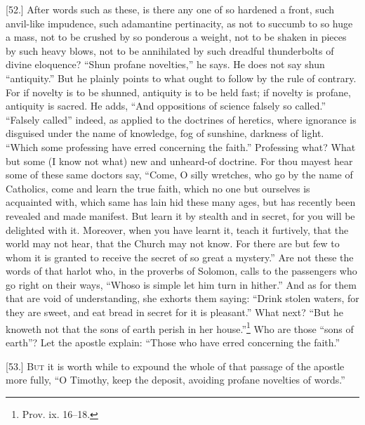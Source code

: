 [52.] After words such as these, is there any one of so hardened a front, such anvil-like impudence, such adamantine pertinacity, as not to succumb to so huge a mass, not to be crushed by so ponderous a weight, not to be shaken in pieces by such heavy blows, not to be annihilated by such dreadful thunderbolts of divine eloquence? “Shun profane novelties,” he says. He does not say shun “antiquity.” But he plainly points to what ought to follow by the rule of contrary. For if novelty is to be shunned, antiquity is to be held fast; if novelty is profane, antiquity is sacred. He adds, “And oppositions of science falsely so called.” “Falsely called” indeed, as applied to the doctrines of heretics, where ignorance is disguised under the name of knowledge, fog of sunshine, darkness of light. “Which some professing have erred concerning the faith.” Professing what? What but some (I know not what) new and unheard-of doctrine. For thou mayest hear some of these same doctors say, “Come, O silly wretches, who go by the name of Catholics, come and learn the true faith, which no one but ourselves is acquainted with, which same has lain hid these many ages, but has recently been revealed and made manifest. But learn it by stealth and in secret, for you will be delighted with it. Moreover, when you have learnt it, teach it furtively, that the world may not hear, that the Church may not know. For there are but few to whom it is granted to receive the secret of so great a mystery.” Are not these the words of that harlot who, in the proverbs of Solomon, calls to the passengers who go right on their ways, “Whoso is simple let him turn in hither.” And as for them that are void of understanding, she exhorts them saying: “Drink stolen waters, for they are sweet, and eat bread in secret for it is pleasant.” What next? “But he knoweth not that the sons of earth perish in her house.”\footnote{Prov. ix. 16–18.} Who are those “sons of earth”? Let the apostle explain: “Those who have erred concerning the faith.”


[53.] \textsc{But} it is worth while to expound the whole of that passage of the apostle more fully, “O Timothy, keep the deposit, avoiding profane novelties of words.”

